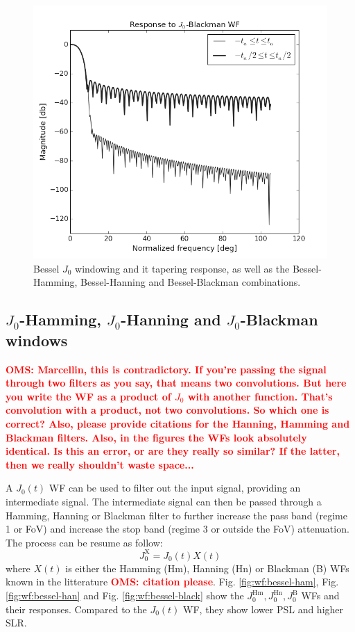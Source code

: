 \documentclass[useAMS,usenatbib]{mn2e}
\newcommand{\OMS}[1]{\textcolor{red}{{\bf OMS: #1}}}
\begin{document}
\begin{figure}
\includegraphics[width=.25\textwidth]{./Figures/freq_resp_bessel-blackmangrey.png}
\caption{Bessel $J_0$ windowing and it tapering response, as well as the Bessel-Hamming, Bessel-Hanning
and Bessel-Blackman combinations.}\label{fig:wf:bessels}
\end{figure}

\subsection{$J_0$-Hamming, $J_0$-Hanning and $J_0$-Blackman windows}

\OMS{Marcellin, this is contradictory. If you're passing the signal through two filters as you say, that means 
two convolutions. But here you write the WF as a product of $J_0$ with another function. That's convolution with a 
product, not two convolutions. So which one is correct? Also, please provide citations for the Hanning, Hamming and 
Blackman filters. Also, in the figures the WFs look absolutely identical. Is this an error, or are they really so similar?
If the latter, then we really shouldn't waste space...}

A $J_0(t)$ WF can be used to filter out the input signal, providing an intermediate signal. The intermediate signal 
can then be passed through a Hamming, Hanning or Blackman filter to further increase the pass band (regime 1 or FoV) and 
increase the stop band (regime 3 or outside the FoV) attenuation. The process can be resume as follow:
\begin{equation}
J_0^\mathrm{X} = J_0(t) X(t) 
\end{equation}
where $X(t)$ is either the Hamming (Hm), Hanning (Hn) or Blackman (B) WFs known in the litterature \OMS{citation please}.
Fig. \ref{fig:wf:bessel-ham}, Fig. \ref{fig:wf:bessel-han} and Fig. \ref{fig:wf:bessel-black} 
show the $J_0^\mathrm{Hm}, J_0^\mathrm{Hn}, J_0^\mathrm{B}$ WFs and their responses. Compared to the $J_0(t)$ WF, 
they show lower PSL and higher SLR.
\end{document}
